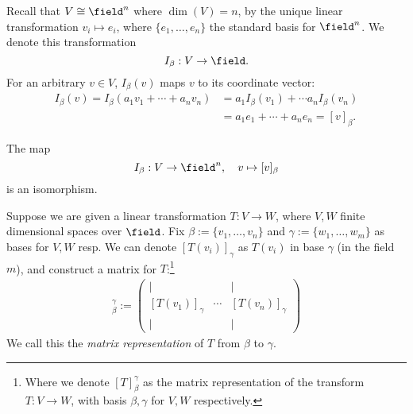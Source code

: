 \begin{remark}
    Recall that $V \cong \field^n$ where $\dim(V) = n$, by the unique linear transformation $v_i \mapsto e_i$, where $\{e_1, \dots, e_n\}$ the standard basis for $\field^n$. We denote this transformation $$I_\beta : V \to \field.$$ For an arbitrary $v \in V$, $I_\beta (v)$ maps $v$ to its coordinate vector:
    \begin{align}
        I_\beta(v) = I_\beta(a_1v_1  + \cdots + a_n v_n) &= a_1 I_\beta(v_1) + \cdots a_n I_\beta(v_n)\\
        &= a_1 e_1 + \cdots + a_n e_n = [v]_\beta.
    \end{align}
\end{remark}

\begin{proposition}
The map $$I_\beta : V \to \field^n, \quad v \mapsto [v]_\beta$$ is an isomorphism.
\end{proposition}

Suppose we are given a linear transformation $T : V \to W$, where $V, W$ finite dimensional spaces over $\field$. Fix $\beta := \{v_1, \dots, v_n\}$ and $\gamma := \{w_1, \dots, w_m\}$ as bases for $V, W$ resp. We can denote $[T(v_i)]_\gamma$ as $T(v_i)$ in base $\gamma$ (in the field $m$), and construct a matrix for $T$:\footnote{Where we denote $[T]_\beta^\gamma$ as the matrix representation of the transform $T: V \to W$, with basis $\beta, \gamma$ for $V, W$ respectively.}
\begin{align*}
    [T]_\beta^\gamma := \begin{pmatrix}
        \vert & & \vert\\
        [T(v_1)]_\gamma & \cdots & [T(v_n)]_\gamma\\
        \vert& & \vert
    \end{pmatrix}
\end{align*}
We call this the \emph{matrix representation} of $T$ from $\beta$ to $\gamma$.

